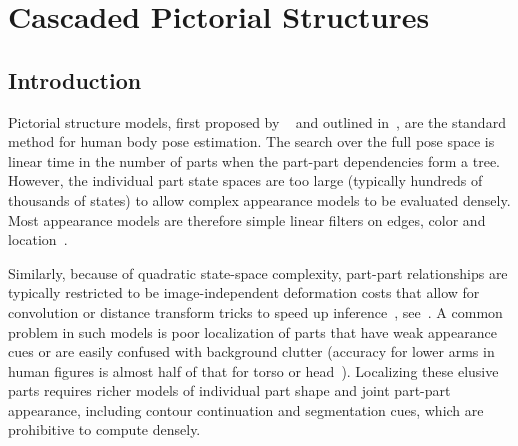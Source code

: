 \chapter{Cascaded Pictorial Structures}\label{sec:CPS}


\section{Introduction}
Pictorial structure models, first proposed by ~\cite{fischler1973ps} and 
outlined in~, are the standard method for human body pose 
estimation. The search over the full pose space is linear time in the number of 
parts when the part-part dependencies form a tree.  However,  the individual 
part state spaces are too large (typically hundreds of thousands of states) to 
allow complex appearance models to be evaluated densely.   Most appearance 
models are therefore simple linear filters on edges, color and 
location~\cite{felz05,devacrf,ferrari08,andriluka09}. 

Similarly, because of quadratic state-space complexity, part-part relationships 
are typically restricted to be image-independent deformation costs that allow 
for convolution or distance transform tricks to speed up 
inference~\cite{felz05}, see~. A common problem in such models is 
poor localization of parts that have weak appearance cues or are easily 
confused with background clutter (accuracy for lower arms in human figures is 
almost half of that for torso or head~\cite{andriluka09}).   Localizing these 
elusive parts requires richer models of individual part shape and joint 
part-part appearance, including contour continuation and segmentation cues, 
which are prohibitive to compute densely.

